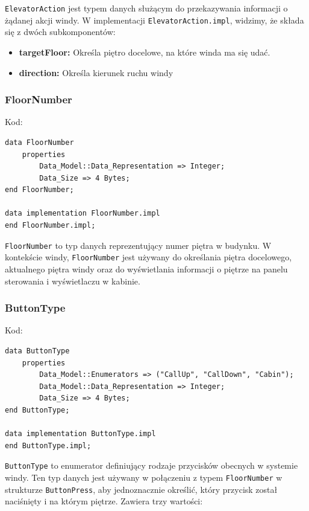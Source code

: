 \documentclass{article}
\begin{document}
    \texttt{ElevatorAction} jest typem danych służącym do przekazywania informacji o żądanej akcji windy. W implementacji \texttt{ElevatorAction.impl}, widzimy, że składa się z dwóch subkomponentów:

    \begin{itemize}
        \item \textbf{targetFloor:} Określa piętro docelowe, na które winda ma się udać.
        \item \textbf{direction:} Określa kierunek ruchu windy
    \end{itemize}


    \subsubsection{FloorNumber}

    Kod:
    
        \begin{lstlisting}[basicstyle=\ttfamily, keywordstyle=\bfseries]
data FloorNumber
    properties
        Data_Model::Data_Representation => Integer;
        Data_Size => 4 Bytes;
end FloorNumber;

data implementation FloorNumber.impl
end FloorNumber.impl;
        \end{lstlisting}
    
        \texttt{FloorNumber} to typ danych reprezentujący numer piętra w budynku. W kontekście windy, \texttt{FloorNumber} jest używany do określania piętra docelowego, aktualnego piętra windy oraz do wyświetlania informacji o piętrze na panelu sterowania i wyświetlaczu w kabinie.
    

    \subsubsection{ButtonType}

    Kod:
    
    \begin{lstlisting}[basicstyle=\ttfamily, keywordstyle=\bfseries]
data ButtonType
    properties
        Data_Model::Enumerators => ("CallUp", "CallDown", "Cabin");
        Data_Model::Data_Representation => Integer;
        Data_Size => 4 Bytes;
end ButtonType;

data implementation ButtonType.impl
end ButtonType.impl;
    \end{lstlisting}

    \texttt{ButtonType} to enumerator definiujący rodzaje przycisków obecnych w systemie windy. Ten typ danych jest używany w połączeniu z typem \texttt{FloorNumber} w strukturze \texttt{ButtonPress}, aby jednoznacznie określić, który przycisk został naciśnięty i na którym piętrze. Zawiera trzy wartości:
\end{document}
